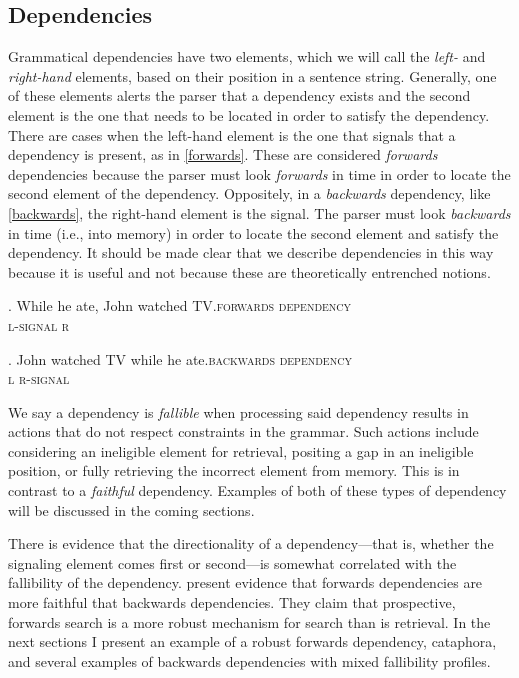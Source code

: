 \documentclass[12pt,letterpaper]{article}
\begin{document}
\subsection{Dependencies} 

Grammatical dependencies have two elements, which we will call the \emph{left-} and \emph{right-hand} elements, based on their position in a sentence string. Generally, one of these elements alerts the parser that a dependency exists and the second element is the one that needs to be located in order to satisfy the dependency. There are cases when the left-hand element is the one that signals that a dependency is present, as in \ref{forwards}. These are considered \emph{forwards} dependencies because the parser must look \emph{forwards} in time in order to locate the second element of the dependency. Oppositely, in a \emph{backwards} dependency, like \ref{backwards}, the right-hand element is the signal. The parser must look \emph{backwards} in time (i.e., into memory) in order to locate the second element and satisfy the dependency. It should be made clear that we describe dependencies in this way because it is useful and not because these are theoretically entrenched notions.

\exg. While he ate, John watched TV.\hspace{2.65em}\textsc{forwards dependency}\\
      {} \textsc{l-signal} {} \textsc{r}\\ \label{forwards}

\exg. John watched TV while he ate.\hspace{3em}\textsc{backwards dependency}\\
      \textsc{l} {} {} {} \textsc{r-signal}\\ \label{backwards}

We say a dependency is \emph{fallible} when processing said dependency results in actions that do not respect constraints in the grammar. Such actions include considering an ineligible element for retrieval, positing a gap in an ineligible position, or fully retrieving the incorrect element from memory. This is in contrast to a \emph{faithful} dependency. Examples of both of these types of dependency will be discussed in the coming sections.

There is evidence that the directionality of a dependency---that is, whether the signaling element comes first or second---is somewhat correlated with the fallibility of the dependency. \citet{phillips09} present evidence that forwards dependencies are more faithful that backwards dependencies. They claim that prospective, forwards search is a more robust mechanism for search than is retrieval. In the next sections I present an example of a robust forwards dependency, cataphora, and several examples of backwards dependencies with mixed fallibility profiles.
\end{document}
